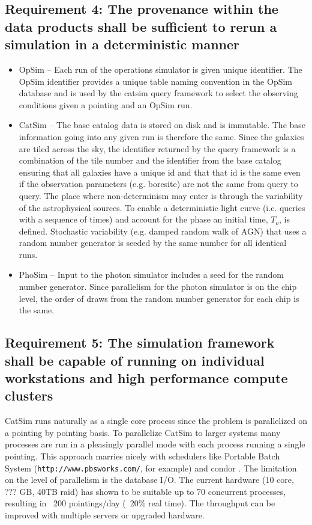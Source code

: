 \documentclass[]{article}
\begin{document}
{\subsection{Requirement 4: The provenance within the data products shall be sufficient to rerun a simulation in a 
deterministic manner}
\begin{itemize}
\item OpSim -- Each run of the operations simulator is given unique identifier.  
The OpSim identifier provides a unique table naming convention in the OpSim database and is used by the catsim
query framework to select the observing conditions given a pointing and an OpSim run.
\item CatSim -- The base catalog data is stored on disk and is immutable. The base information
going into any given run is therefore the same.  Since the galaxies are tiled across the sky, the identifier returned
by the query framework is a combination of the tile number and the identifier from the base catalog ensuring that
all galaxies have a unique id and that that id is the same even if the observation parameters (e.g. boresite) are 
not the same from query to query.  The place where non-determinism may enter is through the variability of the astrophysical
sources.
To enable a deterministic light curve (i.e. queries with a sequence of times) and account for the phase
an initial time, $T_o$, is defined.
Stochastic variability (e.g. damped random walk of AGN) that uses a random number generator is seeded by the same number for all identical runs.
\item PhoSim -- Input to the photon simulator includes a seed for the random number generator.  Since parallelism for
the photon simulator is on the chip level, the order of draws from the random number generator for each chip is the same.
\end{itemize}

\subsection{Requirement 5: The simulation framework shall be capable of running on individual workstations 
and high performance compute clusters}
CatSim runs naturally as a single core process since the problem is parallelized on a pointing by pointing basis.
To parallelize CatSim to larger systems many processes are run in a pleasingly parallel mode with each process running
a single pointing.  This approach marries nicely with schedulers like Portable Batch System ({\tt http://www.pbsworks.com/}, for example) 
and condor \citep{condor}.  
The limitation on the level of parallelism 
is the database I/O.  The current hardware (10 core, ??? GB, 40TB raid) has shown to be suitable up to 70 concurrent processes, 
resulting in ~200 pointings/day (~20\% real time).  The throughput can be improved with multiple servers or upgraded hardware.

}
\end{document}
